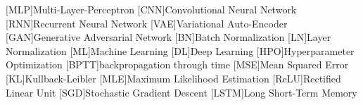 \begin{acronym}[AAAAAA]
    [MLP]{Multi-Layer-Perceptron}
    [CNN]{Convolutional Neural Network}
    [RNN]{Recurrent Neural Network}
    [VAE]{Variational Auto-Encoder}
    [GAN]{Generative Adversarial Network}
    [BN]{Batch Normalization}
    [LN]{Layer Normalization}
    [ML]{Machine Learning}
    [DL]{Deep Learning}
    [HPO]{Hyperparameter Optimization}
    [BPTT]{backpropagation through time}
    [MSE]{Mean Squared Error}
    [KL]{Kullback-Leibler}
    [MLE]{Maximum Likelihood Estimation}
    [ReLU]{Rectified Linear Unit}
    [SGD]{Stochastic Gradient Descent}
    [LSTM]{Long Short-Term Memory}
\end{acronym}